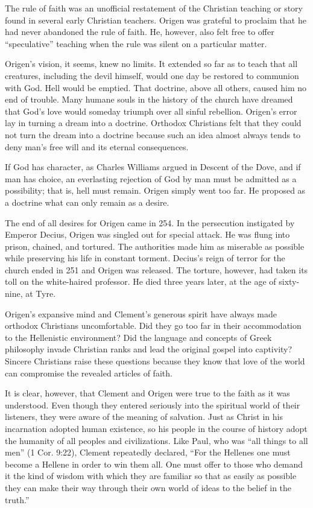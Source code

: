 The rule of faith was an unofficial restatement of the Christian teaching or story found in several
early Christian teachers. Origen was grateful to proclaim that he had never abandoned the rule of
faith. He, however, also felt free to offer “speculative” teaching when the rule was silent on a
particular matter.

Origen’s vision, it seems, knew no limits. It extended so far as to teach that all creatures,
including the devil himself, would one day be restored to communion with God. Hell would be emptied.
That doctrine, above all others, caused him no end of trouble. Many humane souls in the history of
the church have dreamed that God’s love would someday triumph over all sinful rebellion. Origen’s
error lay in turning a dream into a doctrine. Orthodox Christians felt that they could not turn the
dream into a doctrine because such an idea almost always tends to deny man’s free will and its
eternal consequences.

If God has character, as Charles Williams argued in Descent of the Dove, and if man has choice, an
everlasting rejection of God by man must be admitted as a possibility; that is, hell must remain.
Origen simply went too far. He proposed as a doctrine what can only remain as a desire.

The end of all desires for Origen came in 254. In the persecution instigated by Emperor Decius,
Origen was singled out for special attack. He was flung into prison, chained, and tortured. The
authorities made him as miserable as possible while preserving his life in constant torment.
Decius’s reign of terror for the church ended in 251 and Origen was released. The torture, however,
had taken its toll on the white-haired professor. He died three years later, at the age of
sixty-nine, at Tyre.

Origen’s expansive mind and Clement’s generous spirit have always made orthodox Christians
uncomfortable. Did they go too far in their accommodation to the Hellenistic environment? Did the
language and concepts of Greek philosophy invade Christian ranks and lead the original gospel into
captivity? Sincere Christians raise these questions because they know that love of the world can
compromise the revealed articles of faith.

It is clear, however, that Clement and Origen were true to the faith as it was understood. Even
though they entered seriously into the spiritual world of their listeners, they were aware of the
meaning of salvation. Just as Christ in his incarnation adopted human existence, so his people in
the course of history adopt the humanity of all peoples and civilizations. Like Paul, who was “all
things to all men” (1 Cor. 9:22), Clement repeatedly declared, “For the Hellenes one must become a
Hellene in order to win them all. One must offer to those who demand it the kind of wisdom with
which they are familiar so that as easily as possible they can make their way through their own
world of ideas to the belief in the truth.”

